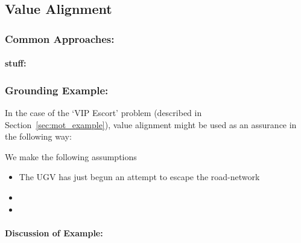 \subsection{Value Alignment} \label{sec:value_alignment}


\subsubsection{Common Approaches:}

\paragraph{stuff:}


\subsubsection{Grounding Example:}
In the case of the `VIP Escort' problem (described in Section~\ref{sec:mot_example}), value alignment might be used as an assurance in the following way:

We make the following assumptions

\begin{itemize}
    \item The UGV has just begun an attempt to escape the road-network
    \item 
    \item 
\end{itemize}

\paragraph{\textbf{Discussion of Example:}} 
